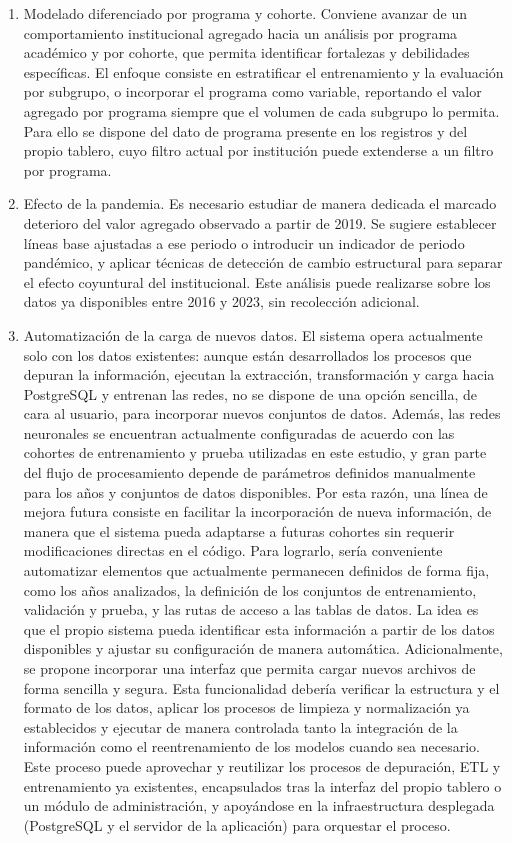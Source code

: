 \begin{enumerate}
	\item Modelado diferenciado por programa y cohorte. Conviene avanzar de un comportamiento institucional agregado hacia un análisis por programa académico y por cohorte, que permita identificar fortalezas y debilidades específicas. El enfoque consiste en estratificar el entrenamiento y la evaluación por subgrupo, o incorporar el programa como variable, reportando el valor agregado por programa siempre que el volumen de cada subgrupo lo permita. Para ello se dispone del dato de programa presente en los registros y del propio tablero, cuyo filtro actual por institución puede extenderse a un filtro por programa.
	\item Efecto de la pandemia. Es necesario estudiar de manera dedicada el marcado deterioro del valor agregado observado a partir de 2019. Se sugiere establecer líneas base ajustadas a ese periodo o introducir un indicador de periodo pandémico, y aplicar técnicas de detección de cambio estructural para separar el efecto coyuntural del institucional. Este análisis puede realizarse sobre los datos ya disponibles entre 2016 y 2023, sin recolección adicional.
	\item Automatización de la carga de nuevos datos. El sistema opera actualmente solo con los datos existentes: aunque están desarrollados los procesos que depuran la información, ejecutan la extracción, transformación y carga hacia PostgreSQL y entrenan las redes, no se dispone de una opción sencilla, de cara al usuario, para incorporar nuevos conjuntos de datos. Además, las redes neuronales se encuentran actualmente configuradas de acuerdo con las cohortes de entrenamiento y prueba utilizadas en este estudio, y gran parte del flujo de procesamiento depende de parámetros definidos manualmente para los años y conjuntos de datos disponibles. Por esta razón, una línea de mejora futura consiste en facilitar la incorporación de nueva información, de manera que el sistema pueda adaptarse a futuras cohortes sin requerir modificaciones directas en el código. Para lograrlo, sería conveniente automatizar elementos que actualmente permanecen definidos de forma fija, como los años analizados, la definición de los conjuntos de entrenamiento, validación y prueba, y las rutas de acceso a las tablas de datos. La idea es que el propio sistema pueda identificar esta información a partir de los datos disponibles y ajustar su configuración de manera automática. Adicionalmente, se propone incorporar una interfaz que permita cargar nuevos archivos de forma sencilla y segura. Esta funcionalidad debería verificar la estructura y el formato de los datos, aplicar los procesos de limpieza y normalización ya establecidos y ejecutar de manera controlada tanto la integración de la información como el reentrenamiento de los modelos cuando sea necesario. Este proceso puede aprovechar y reutilizar los procesos de depuración, ETL y entrenamiento ya existentes, encapsulados tras la interfaz del propio tablero o un módulo de administración, y apoyándose en la infraestructura desplegada (PostgreSQL y el servidor de la aplicación) para orquestar el proceso.

\end{enumerate}

